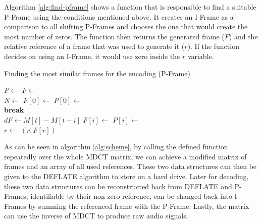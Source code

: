 Algorithm \ref{alg:find-pframe} shows a function that is responsible to find a suitable P-Frame using the conditions mentioned above. It creates an I-Frame as a comparison to all shifting P-Frames and chooses the one that would create the most number of zeros. The function then returns the generated frame ($F$) and the relative reference of a frame that was used to generate it ($r$). If the function decides on using an I-Frame, it would use zero inside the $r$ variable.

\begin{algorithm}[ht]
\caption{Finding the most similar frames for the encoding (P-Frame)}
\label{alg:find-pframe}
\begin{algorithmic}
    \State $P \gets$ 
    \State $F \gets$ 
    \\
    \State $N \gets$ 
    \State $F[0] \gets$  
    \State $P[0] \gets$ 
    \\
            \State \textbf{break} 
        \EndIf
        \\
        \State $dF \gets M[t] - M[t - i]$
        \State $F[i] \gets$  
        \State $P[i] \gets$ 
    \EndFor
    \\
    \State $r \gets$  
    \State \Return $(r, F[r])$
\EndFunction
\end{algorithmic}
\end{algorithm}

As can be seen in algorithm \ref{alg:scheme}, by calling the defined function repeatedly over the whole MDCT matrix, we can achieve a modified matrix of frames and an array of all used references. These two data structures can then be given to the DEFLATE algorithm to store on a hard drive. Later for decoding, these two data structures can be reconstructed back from DEFLATE and P-Frames, identifiable by their non-zero reference, can be changed back into I-Frames by summing the referenced frame with the P-Frame. Lastly, the matrix can use the inverse of MDCT to produce raw audio signals.

